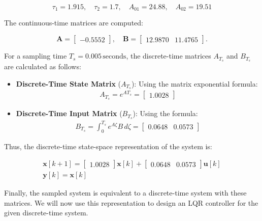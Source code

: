 \[
\tau_1 = 1.915, \quad \tau_2 = 1.7, \quad A_{01} = 24.88, \quad A_{02} = 19.51
\]

The continuous-time matrices are computed:

\[
\mathbf{A} = 
\begin{bmatrix}
-0.5552
\end{bmatrix}, \quad 
\mathbf{B} = 
\begin{bmatrix}
12.9870 & 11.4765
\end{bmatrix}.
\]

For a sampling time \( T_s = 0.005 \, \text{seconds} \), the discrete-time matrices \( A_{T_s} \) and \( B_{T_s} \) are calculated as follows:

\begin{itemize}
    \item \textbf{Discrete-Time State Matrix} (\(A_{T_s}\)): 
   Using the matrix exponential formula:
   \begin{gather*}
        A_{T_s} = e^{A T_s} = \begin{bmatrix} 1.0028 \end{bmatrix}    
   \end{gather*}
   

\end{itemize}


\begin{itemize} 
    \item \textbf{Discrete-Time Input Matrix} (\(B_{T_s}\)): 
   Using the formula:
   \begin{gather*}
    B_{T_s} = \int_0^{T_s} e^{A \zeta} B \, d\zeta = \begin{bmatrix} 0.0648 & 0.0573\end{bmatrix}    
   \end{gather*}
   
\end{itemize}

Thus, the discrete-time state-space representation of the system is:

\begin{gather*}
    \mathbf{x}[k+1] = 
        \begin{bmatrix} 1.0028 \end{bmatrix} \mathbf{x}[k] 
    + \begin{bmatrix} 0.0648 & 0.0573 \end{bmatrix} \mathbf{u}[k]\\
    \mathbf{y}[k] = \mathbf{x}[k]
\end{gather*}


Finally, the sampled system is equivalent to a discrete-time system with these matrices. We will now use this representation to design an LQR controller for the given discrete-time system.

